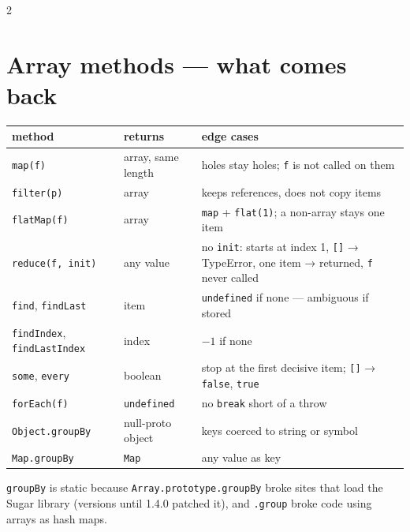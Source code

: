 \documentclass[8pt]{extarticle}
\begin{document}
\begin{multicols}{2}
\section{Array methods — what comes back}
{\scriptsize\setlength{\tabcolsep}{2pt}
\begin{tabular}{@{}>{\raggedright\arraybackslash}p{24mm}>{\raggedright\arraybackslash}p{14mm}>{\raggedright\arraybackslash}p{39mm}@{}}
\toprule
\textbf{method} & \textbf{returns} & \textbf{edge cases}\\
\midrule
\texttt{map(f)} & array, same length & holes stay holes; \texttt{f} is not called on them\\
\texttt{filter(p)} & array & keeps references, does not copy items\\
\texttt{flatMap(f)} & array & \texttt{map} + \texttt{flat(1)}; a non-array stays one item\\
\texttt{reduce(f, init)} & any value & no \texttt{init}: starts at index 1, \texttt{[]} → TypeError, one item → returned, \texttt{f} never called\\
\texttt{find}, \texttt{findLast} & item & \texttt{undefined} if none — ambiguous if stored\\
\texttt{findIndex}, \texttt{findLastIndex} & index & $-1$ if none\\
\texttt{some}, \texttt{every} & boolean & stop at the first decisive item; \texttt{[]} → \texttt{false}, \texttt{true}\\
\texttt{forEach(f)} & \texttt{undefined} & no \texttt{break} short of a throw\\
\texttt{Object.groupBy} & null-proto object & keys coerced to string or symbol\\
\texttt{Map.groupBy} & \texttt{Map} & any value as key\\
\bottomrule
\end{tabular}}\par
\texttt{groupBy} is static because \texttt{Array.prototype.groupBy} broke sites that load the
Sugar library (versions until 1.4.0 patched it), and \texttt{.group} broke code using arrays
as hash maps.


\end{multicols}
\end{document}
